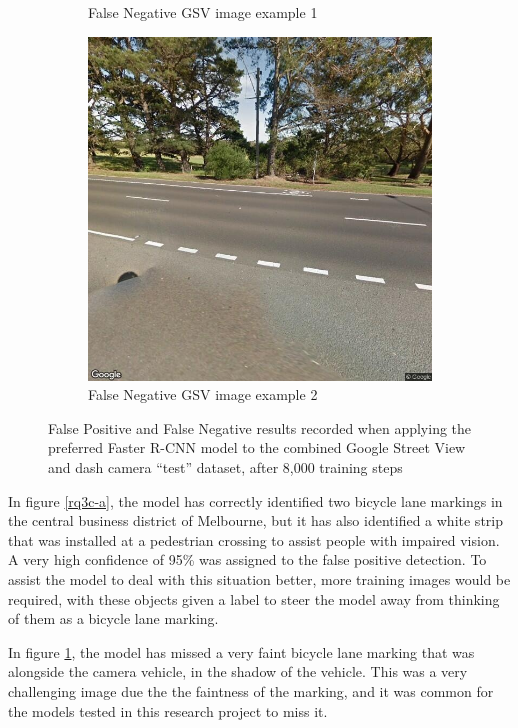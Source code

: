 \documentclass[11pt,twoside]{report}
\begin{document}
\begin{figure}[h]
\begin{subfigure}{0.3\textwidth}
	\caption{False Negative GSV image example 1}
	\label{rq3c-b}
\end{subfigure}
\hfill
\begin{subfigure}{0.3\textwidth}
	\includegraphics[width=\textwidth]{V2_8000_FN2.jpg}
	\caption{False Negative GSV image example 2}
	\label{rq3c-c}
\end{subfigure}

\caption{False Positive and False Negative results recorded when applying the preferred Faster R-CNN model to the combined Google Street View and dash camera ``test'' dataset, after 8,000 training steps}
\label{fig:rq3c}
\end{figure}

In figure \ref{rq3c-a}, the model has correctly identified two bicycle lane markings in the central business district of Melbourne, but it has also identified a white strip that was installed at a pedestrian crossing to assist people with impaired vision.  A very high confidence of 95\% was assigned to the false positive detection.  To assist the model to deal with this situation better, more training images would be required, with these objects given a label to steer the model away from thinking of them as a bicycle lane marking.

In figure \ref{rq3c-b}, the model has missed a very faint bicycle lane marking that was alongside the camera vehicle, in the shadow of the vehicle.  This was a very challenging image due the the faintness of the marking, and it was common for the models tested in this research project to miss it.
\end{document}
